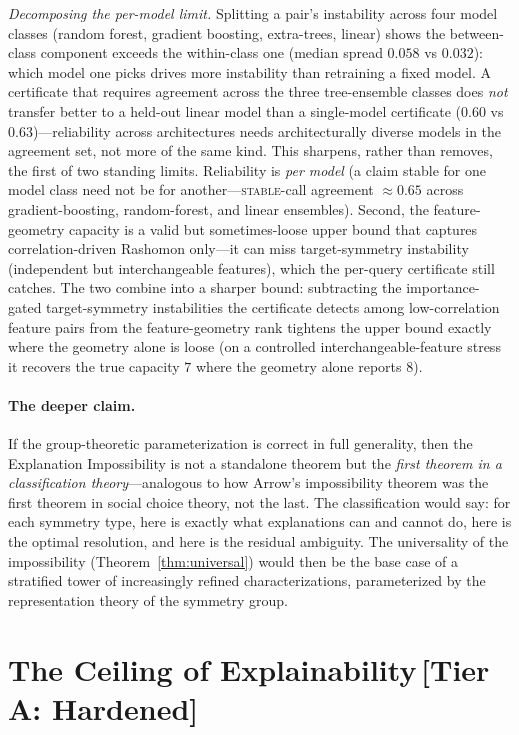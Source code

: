\documentclass[11pt,a4paper]{article}
\begin{document}
\emph{Decomposing the per-model limit.}  Splitting a pair's instability across four model classes
(random forest, gradient boosting, extra-trees, linear) shows the between-class component exceeds the
within-class one (median spread $0.058$ vs $0.032$): which model one picks drives more instability
than retraining a fixed model.  A certificate that requires agreement across the three tree-ensemble
classes does \emph{not} transfer better to a held-out linear model than a single-model certificate
($0.60$ vs $0.63$)---reliability across architectures needs architecturally diverse models in the
agreement set, not more of the same kind.  This sharpens, rather than removes, the first of two
standing limits.  Reliability is \emph{per model} (a claim stable for one model class need not be for
another---\textsc{stable}-call agreement ${\approx}0.65$ across gradient-boosting, random-forest, and
linear ensembles).  Second, the feature-geometry capacity is a valid but sometimes-loose upper bound that
captures correlation-driven Rashomon only---it can miss target-symmetry instability (independent but
interchangeable features), which the per-query certificate still catches.  The two combine into a
sharper bound: subtracting the importance-gated target-symmetry instabilities the certificate detects
among low-correlation feature pairs from the feature-geometry rank tightens the upper bound exactly
where the geometry alone is loose (on a controlled interchangeable-feature stress it recovers the
true capacity $7$ where the geometry alone reports $8$).

\paragraph{The deeper claim.}
If the group-theoretic parameterization is correct in full generality, then
the Explanation Impossibility is not a standalone theorem but the \emph{first
theorem in a classification theory}---analogous to how Arrow's impossibility
theorem \citep{arrow1951social} was the first theorem in social choice theory,
not the last.  The classification would say: for each symmetry type, here is
exactly what explanations can and cannot do, here is the optimal resolution,
and here is the residual ambiguity.  The universality of the impossibility
(Theorem~\ref{thm:universal}) would then be the base case of a stratified
tower of increasingly refined characterizations, parameterized by the
representation theory of the symmetry group.

\section{The Ceiling of Explainability\,\textnormal{\normalsize[Tier A: Hardened]}}
\label{sec:ceiling}
\end{document}
